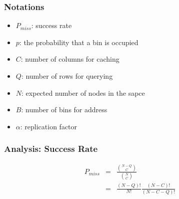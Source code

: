 \documentclass[red]{beamer}
\begin{document}

\begin{frame}
\frametitle{Notations}
\begin{itemize}
\item $P_{miss}$: success rate
\item $p$: the probability that a bin is occupied
\item $C$: number of columns for caching
\item $Q$: number of rows for querying
\item $N$: expected number of nodes in the sapce
\item $B$: number of bins for address
\item $\alpha$: replication factor
\end{itemize}
\end{frame}
\begin{frame}
\frametitle{Analysis: Success Rate}
\small{
\begin{eqnarray}
P_{miss} &=& \frac{{{N-Q}\choose{C}}}{{{N}\choose{C}}}\\
         &=& \frac{(N-Q)!}{N!}\frac{(N-C)!}{(N-C-Q)!}
\end{eqnarray}
}
\end{frame}
\end{document}
